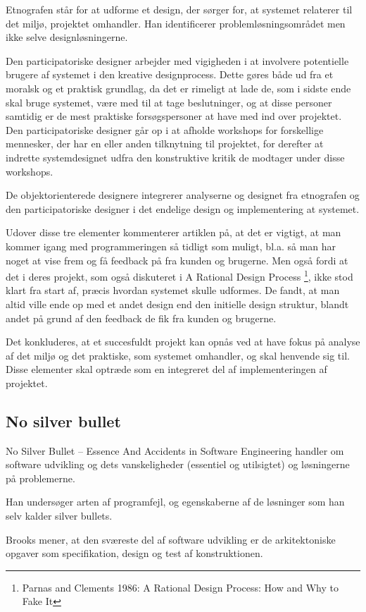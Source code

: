 \documentclass[12pt,a4paper]{article}
\begin{document}
Etnografen står for at udforme et design, der sørger for, at systemet relaterer til det miljø, projektet omhandler. Han identificerer problemløsningsområdet men ikke selve designløsningerne.

Den participatoriske designer arbejder med vigigheden i at involvere potentielle brugere af systemet i den kreative designprocess. Dette gøres både ud fra et moralsk og et praktisk grundlag, da det er rimeligt at lade de, som i sidste ende skal bruge systemet, være med til at tage beslutninger, og at disse personer samtidig er de mest praktiske forsøgspersoner at have med ind over projektet. 
Den participatoriske designer går op i at afholde workshops for forskellige mennesker, der har en eller anden tilknytning til projektet, for derefter at indrette systemdesignet udfra den konstruktive kritik de modtager under disse workshops.

De objektorienterede designere integrerer analyserne og designet fra etnografen og den participatoriske designer i det endelige design og implementering at systemet.

Udover disse tre elementer kommenterer artiklen på, at det er vigtigt, at man kommer igang med programmeringen så tidligt som muligt, bl.a. så man har noget at vise frem og få feedback på fra kunden og brugerne. Men også fordi at det i deres projekt, som også diskuteret i A Rational Design Process \footnote{Parnas and Clements 1986: A Rational Design Process: How and Why to Fake It }, ikke stod klart fra start af, præcis hvordan systemet skulle udformes. 
De fandt, at man altid ville ende op med et andet design end den initielle design struktur, blandt andet på grund af den feedback de fik fra kunden og brugerne. 

Det konkluderes, at et succesfuldt projekt kan opnås ved at have fokus på analyse af det miljø og det praktiske, som systemet omhandler, og skal henvende sig til. Disse elementer skal optræde som en integreret del af implementeringen af projektet.
\subsection{No silver bullet}
No Silver Bullet – Essence And Accidents in Software Engineering handler om software udvikling og dets vanskeligheder (essentiel og utilsigtet) og løsningerne på problemerne. 

Han undersøger arten af programfejl, og egenskaberne af de løsninger som han selv kalder silver bullets. 

Brooks mener, at den sværeste del af software udvikling er de arkitektoniske opgaver som specifikation, design og test af konstruktionen.
\end{document}
